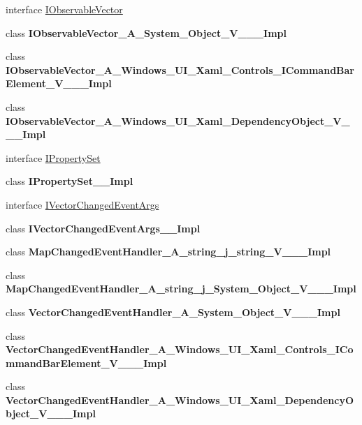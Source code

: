 \begin{DoxyCompactItemize}
\item 
interface \hyperlink{interface_windows_1_1_foundation_1_1_collections_1_1_i_observable_vector}{I\+Observable\+Vector}
\item 
class {\bfseries I\+Observable\+Vector\+\_\+\+A\+\_\+\+System\+\_\+\+Object\+\_\+\+V\+\_\+\+\_\+\+\_\+\+Impl}
\item 
class {\bfseries I\+Observable\+Vector\+\_\+\+A\+\_\+\+Windows\+\_\+\+U\+I\+\_\+\+Xaml\+\_\+\+Controls\+\_\+\+I\+Command\+Bar\+Element\+\_\+\+V\+\_\+\+\_\+\+\_\+\+Impl}
\item 
class {\bfseries I\+Observable\+Vector\+\_\+\+A\+\_\+\+Windows\+\_\+\+U\+I\+\_\+\+Xaml\+\_\+\+Dependency\+Object\+\_\+\+V\+\_\+\+\_\+\+\_\+\+Impl}
\item 
interface \hyperlink{interface_windows_1_1_foundation_1_1_collections_1_1_i_property_set}{I\+Property\+Set}
\item 
class {\bfseries I\+Property\+Set\+\_\+\+\_\+\+Impl}
\item 
interface \hyperlink{interface_windows_1_1_foundation_1_1_collections_1_1_i_vector_changed_event_args}{I\+Vector\+Changed\+Event\+Args}
\item 
class {\bfseries I\+Vector\+Changed\+Event\+Args\+\_\+\+\_\+\+Impl}
\item 
class {\bfseries Map\+Changed\+Event\+Handler\+\_\+\+A\+\_\+string\+\_\+j\+\_\+string\+\_\+\+V\+\_\+\+\_\+\+\_\+\+Impl}
\item 
class {\bfseries Map\+Changed\+Event\+Handler\+\_\+\+A\+\_\+string\+\_\+j\+\_\+\+System\+\_\+\+Object\+\_\+\+V\+\_\+\+\_\+\+\_\+\+Impl}
\item 
class {\bfseries Vector\+Changed\+Event\+Handler\+\_\+\+A\+\_\+\+System\+\_\+\+Object\+\_\+\+V\+\_\+\+\_\+\+\_\+\+Impl}
\item 
class {\bfseries Vector\+Changed\+Event\+Handler\+\_\+\+A\+\_\+\+Windows\+\_\+\+U\+I\+\_\+\+Xaml\+\_\+\+Controls\+\_\+\+I\+Command\+Bar\+Element\+\_\+\+V\+\_\+\+\_\+\+\_\+\+Impl}
\item 
class {\bfseries Vector\+Changed\+Event\+Handler\+\_\+\+A\+\_\+\+Windows\+\_\+\+U\+I\+\_\+\+Xaml\+\_\+\+Dependency\+Object\+\_\+\+V\+\_\+\+\_\+\+\_\+\+Impl}
\end{DoxyCompactItemize}
